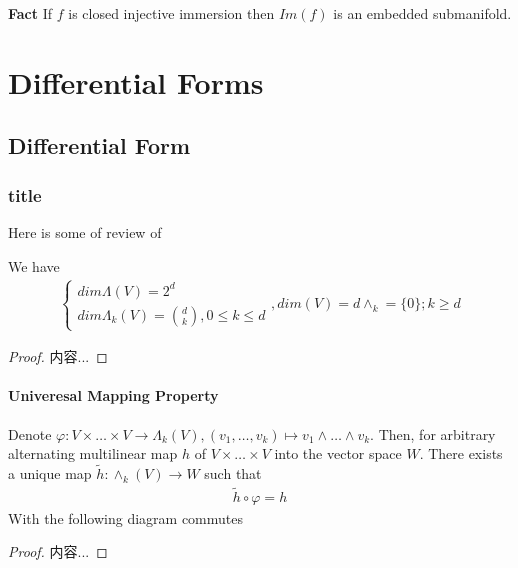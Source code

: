 \documentclass[Total.tex]{subfiles}
\begin{document}
			\textbf{Fact} If $f$ is closed injective immersion then $Im(f)$ is an embedded submanifold.
	\chapter{Differential Forms}
		\section{Differential Form}
			\subsection{title}
			Here is some of review of 
			\begin{proposition}
				We have
				\begin{gather*}
					\begin{cases}
						dim\Lambda(V)=2^d\\
						dim\Lambda_k(V)=\binom{d}{k},0\leq k\leq d
					\end{cases},dim(V)=d
					\wedge_k=\{0\};k\geq d
				\end{gather*}
			\end{proposition}
			\begin{proof}
				内容...
			\end{proof}
					\subsubsection{Univeresal Mapping Property}
						\begin{proposition}
							Denote $\varphi:V\times \dots\times V\rightarrow \Lambda_k(V),(v_1,\dots,v_k)\mapsto v_1\wedge\dots\wedge v_k$. Then, for arbitrary alternating multilinear map $h$ of $V\times \dots\times V$ into the vector space $W$. There exists a unique map $\tilde{h}:\wedge_k(V)\rightarrow W$ such that
							\begin{gather*}
								\tilde{h}\circ \varphi=h
							\end{gather*}
							With the following diagram commutes
							\begin{center}
							\end{center}
						\end{proposition}
						\begin{proof}
							内容...
						\end{proof}
						
\end{document}
